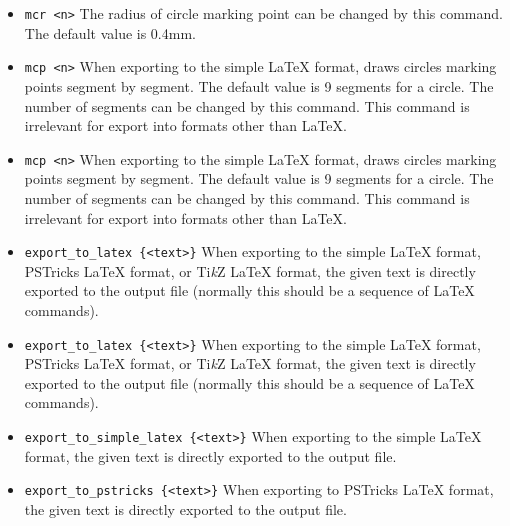 \documentclass[a4paper]{book}
\begin{document}
\begin{itemize}
\item \verb|mcr <n>|
        The radius of circle marking point can be changed by this command.
        The default value is 0.4mm.

\item \verb|mcp <n>|
        When exporting to the simple \LaTeX{} format, draws circles marking points segment
        by segment. The default value is 9 segments for a circle. The
        number of segments can be changed by this command. This command
        is irrelevant for export into formats other than \LaTeX{}.

\item \verb|mcp <n>|
        When exporting to the simple \LaTeX{} format, draws circles marking points segment
        by segment. The default value is 9 segments for a circle. The
        number of segments can be changed by this command. This command
        is irrelevant for export into formats other than \LaTeX{}.

\item \verb|export_to_latex {<text>}|
        When exporting to the simple \LaTeX{} format, PSTricks \LaTeX{} format, or
        Ti{\em k}Z \LaTeX{} format, the given text is directly exported to the output
        file (normally this should be a sequence of \LaTeX{} commands).

\item \verb|export_to_latex {<text>}|
        When exporting to the simple \LaTeX{} format, PSTricks \LaTeX{} format, or
        Ti{\em k}Z \LaTeX{} format, the given text is directly exported to the output
        file (normally this should be a sequence of \LaTeX{} commands).

\item \verb|export_to_simple_latex {<text>}|
        When exporting to the simple \LaTeX{} format, the given text is directly
        exported to the output file.

\item \verb|export_to_pstricks {<text>}|
        When exporting to PSTricks \LaTeX{} format, the given text is directly
        exported to the output file.


\end{itemize}
\end{document}
